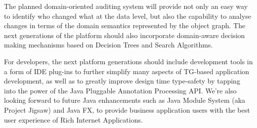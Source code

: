   The planned domain-oriented auditing system will provide not only an easy way to identify who changed what at the data level, but also the capability to analyse changes in terms of the domain semantics represented by the object graph.  
  The next generations of the platform should also incorporate domain-aware decision making mechanisms based on Decision Trees and Search Algorithms.

  For developers, the next platform generations should include development tools in a form of IDE plug-ins to further simplify many aspects of TG-based application development, as well as to greatly improve design time type-safety by tapping into the power of the Java Pluggable Annotation Processing API.
  We're also looking forward to future Java enhancements such as Java Module System (aka Project Jigsaw) and Java FX, to provide business application users with the best user experience of Rich Internet Applications.